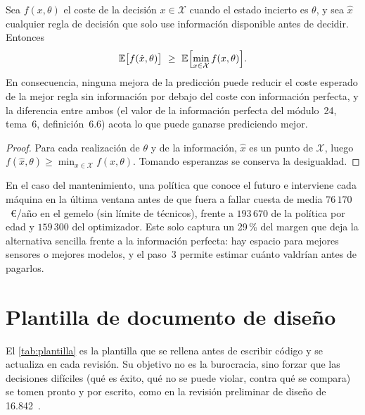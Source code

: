 \begin{proposicion}\label{prop:techo}
Sea $f(x,\theta)$ el coste de la decisión $x\in\mathcal{X}$ cuando el estado incierto es $\theta$, y sea $\hat x$ cualquier regla de decisión que solo use información disponible antes de decidir. Entonces
\[
\E\bigl[f(\hat x,\theta)\bigr]\ \ge\ \E\Bigl[\min_{x\in\mathcal{X}}f(x,\theta)\Bigr].
\]
En consecuencia, ninguna mejora de la predicción puede reducir el coste esperado de la mejor regla sin información por debajo del coste con información perfecta, y la diferencia entre ambos (el valor de la información perfecta del módulo~24, tema~6, definición~6.6) acota lo que puede ganarse prediciendo mejor.
\end{proposicion}

\begin{proof}
Para cada realización de $\theta$ y de la información, $\hat x$ es un punto de $\mathcal{X}$, luego $f(\hat x,\theta)\ge\min_{x\in\mathcal{X}}f(x,\theta)$. Tomando esperanzas se conserva la desigualdad.
\end{proof}

En el caso del mantenimiento, una política que conoce el futuro e interviene cada máquina en la última ventana antes de que fuera a fallar cuesta de media $76\,170$~€/año en el gemelo (sin límite de técnicos), frente a $193\,670$ de la política por edad y $159\,300$ del optimizador. Este solo captura un 29\,\% del margen que deja la alternativa sencilla frente a la información perfecta: hay espacio para mejores sensores o mejores modelos, y el paso~3 permite estimar cuánto valdrían antes de pagarlos.

\section{Plantilla de documento de diseño}

El \cref{tab:plantilla} es la plantilla que se rellena antes de escribir código y se actualiza en cada revisión. Su objetivo no es la burocracia, sino forzar que las decisiones difíciles (qué es éxito, qué no se puede violar, contra qué se compara) se tomen pronto y por escrito, como en la revisión preliminar de diseño de 16.842~\cite{mit16842}.

